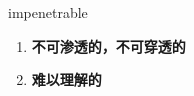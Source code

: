 
\begin{frame}
{\huge impenetrable}
\begin{center}
\begin{enumerate}\Large
  \item \textbf{不可渗透的，不可穿透的}
  \item \textbf{难以理解的}
\end{enumerate}
\end{center}
\end{frame}
